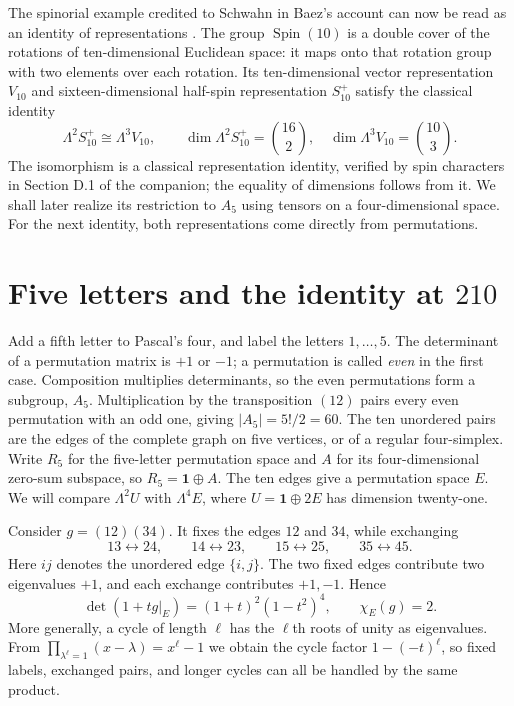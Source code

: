 \documentclass[11pt,a4paper]{article}
\begin{document}
The spinorial example credited to Schwahn in Baez's account can now be read as an identity of representations \citep{Baez2026Coincidences}. The group \(\operatorname{Spin}(10)\) is a double cover of the rotations of ten-dimensional Euclidean space: it maps onto that rotation group with two elements over each rotation. Its ten-dimensional vector representation $V_{10}$ and sixteen-dimensional half-spin representation $S_{10}^{+}$ satisfy the classical identity
\[
\Lambda^2S_{10}^{+}\cong\Lambda^3V_{10},\qquad
\dim\Lambda^2S_{10}^{+}=\binom{16}{2},\quad
\dim\Lambda^3V_{10}=\binom{10}{3}.
\]
The isomorphism is a classical representation identity, verified by spin characters in Section D.1 of the companion; the equality of dimensions follows from it. We shall later realize its restriction to \(A_5\) using tensors on a four-dimensional space. For the next identity, both representations come directly from permutations.

\FloatBarrier
\section[Five letters and the identity at 210]{Five letters and the identity at $210$}\label{sec:five-letters}

Add a fifth letter to Pascal's four, and label the letters \(1,\ldots,5\). The determinant of a permutation matrix is \(+1\) or \(-1\); a permutation is called \emph{even} in the first case. Composition multiplies determinants, so the even permutations form a subgroup, \(A_5\). Multiplication by the transposition \((12)\) pairs every even permutation with an odd one, giving \(|A_5|=5!/2=60\). The ten unordered pairs are the edges of the complete graph on five vertices, or of a regular four-simplex. Write \(R_5\) for the five-letter permutation space and \(A\) for its four-dimensional zero-sum subspace, so \(R_5=\mathbf1\oplus A\). The ten edges give a permutation space \(E\). We will compare \(\Lambda^2U\) with \(\Lambda^4E\), where \(U=\mathbf1\oplus2E\) has dimension twenty-one.

Consider \(g=(12)(34)\). It fixes the edges \(12\) and \(34\), while exchanging
\[
13\leftrightarrow24,\qquad14\leftrightarrow23,\qquad
15\leftrightarrow25,\qquad35\leftrightarrow45.
\]
Here \(ij\) denotes the unordered edge \(\{i,j\}\). The two fixed edges contribute two eigenvalues \(+1\), and each exchange contributes \(+1,-1\). Hence
\[
\det(1+tg|_E)=(1+t)^2(1-t^2)^4,
\qquad\chi_E(g)=2.
\]
More generally, a cycle of length \(\ell\) has the \(\ell\)th roots of unity as eigenvalues. From \(\prod_{\lambda^\ell=1}(x-\lambda)=x^\ell-1\) we obtain the cycle factor \(1-(-t)^\ell\), so fixed labels, exchanged pairs, and longer cycles can all be handled by the same product.
\end{document}
